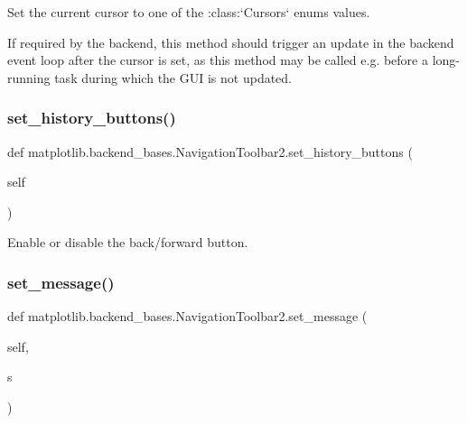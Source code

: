 \begin{DoxyVerb}Set the current cursor to one of the :class:`Cursors` enums values.

If required by the backend, this method should trigger an update in
the backend event loop after the cursor is set, as this method may be
called e.g. before a long-running task during which the GUI is not
updated.
\end{DoxyVerb}
 \mbox{\label{classmatplotlib_1_1backend__bases_1_1NavigationToolbar2_a06703734600e2612f71b6250108df04e}} 
\subsubsection{\texorpdfstring{set\+\_\+history\+\_\+buttons()}{set\_history\_buttons()}}
{\footnotesize\ttfamily def matplotlib.\+backend\+\_\+bases.\+Navigation\+Toolbar2.\+set\+\_\+history\+\_\+buttons (\begin{DoxyParamCaption}\item[{}]{self }\end{DoxyParamCaption})}

\begin{DoxyVerb}Enable or disable the back/forward button.\end{DoxyVerb}
 \mbox{\label{classmatplotlib_1_1backend__bases_1_1NavigationToolbar2_a0a5a900ee84ec6c45750ea3d15053057}} 
\subsubsection{\texorpdfstring{set\+\_\+message()}{set\_message()}}
{\footnotesize\ttfamily def matplotlib.\+backend\+\_\+bases.\+Navigation\+Toolbar2.\+set\+\_\+message (\begin{DoxyParamCaption}\item[{}]{self,  }\item[{}]{s }\end{DoxyParamCaption})}

